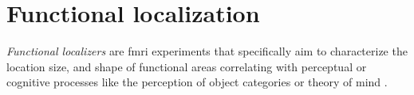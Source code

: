 \section{Functional localization}



\textit{Functional localizers} \citep[cf.,][for reviews]{saxe2006divide,
friston2006critique} are \ac{fmri} experiments that specifically aim to
characterize the location size, and shape of functional areas correlating with
perceptual or cognitive processes like the perception of object categories
\citep{kanwisher1997ffa} or theory of mind \citep{spunt2014validating}.


